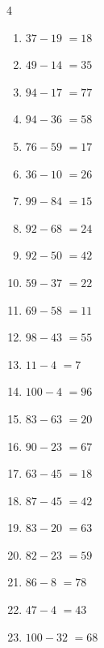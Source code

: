 \begin{multicols}{4}
\begin{enumerate}
  \item $37-19$
        $=18$

  \item $49-14$
        $=35$

\columnbreak %

  \item $94-17$
        $=77$

  \item $94-36$
        $=58$

  \item $76-59$
        $=17$

  \item $36-10$
        $=26$

  \item $99-84$
        $=15$

  \item $92-68$
        $=24$

  \item $92-50$
        $=42$

  \item $59-37$
        $=22$

  \item $69-58$
        $=11$

  \item $98-43$
        $=55$

  \item $11-4$
        $=7$

  \item $100-4$
        $=96$

  \item $83-63$
        $=20$

  \item $90-23$
        $=67$

  \item $63-45$
        $=18$

  \item $87-45$
        $=42$

  \item $83-20$
        $=63$

  \item $82-23$
        $=59$

  \item $86-8$
        $=78$

  \item $47-4$
        $=43$

  \item $100-32$
        $=68$


\end{enumerate}
\end{multicols}
